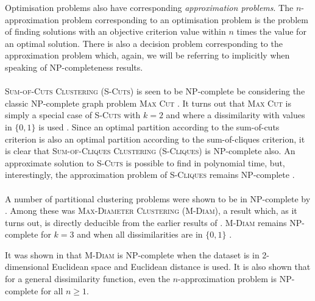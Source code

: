 Optimisation problems also have corresponding \textit{approximation problems}.
The $n$-approximation problem corresponding to an optimisation problem is the
problem of finding solutions with an objective criterion value within $n$
times the value for an optimal solution.  There is also a decision problem
corresponding to the approximation problem which, again, we will be referring
to implicitly when speaking of NP-completeness results.
\\\\
\noindent \textsc{Sum-of-Cuts Clustering} (\textsc{S-Cuts}) is seen to be NP-complete be
considering the classic NP-complete graph problem \textsc{Max Cut}
\citep{karp72twentyone,gonzalez1982computational}.  It turns out that
\textsc{Max Cut} is simply a special case of \textsc{S-Cuts} with $k=2$ and
where a dissimilarity with values in $\{0,1\}$ is used
\citep{garey76simplified}.  Since an optimal partition according to the
sum-of-cuts criterion is also an optimal partition according to the
sum-of-cliques criterion, it is clear that \textsc{Sum-of-Cliques Clustering}
(\textsc{S-Cliques}) is NP-complete also.  An approximate solution to
\textsc{S-Cuts} is possible to find in polynomial time, but, interestingly,
the approximation problem of \textsc{S-Cliques} remains NP-complete
\citep{sahni1976p}.
\\\\
\noindent A number of partitional clustering problems were shown to be in
NP-complete by \citet{brucker1978complexity}.  Among these was
\textsc{Max-Diameter Clustering} (\textsc{M-Diam}), a result which, as it
turns out, is directly deducible from the earlier results of
\citet{sahni1976p}.  \textsc{M-Diam} remains NP-complete for $k=3$ and when
all dissimilarities are in $\{0,1\}$ \citep{gareyjohnson79}.

It was shown in \citet{gonzalez1985clustering} that \textsc{M-Diam} is
NP-complete when the dataset is in 2-dimensional Euclidean space and Euclidean
distance is used.  It is also shown that for a general dissimilarity function,
even the $n$-approximation problem is NP-complete for all $n\geq 1$.

